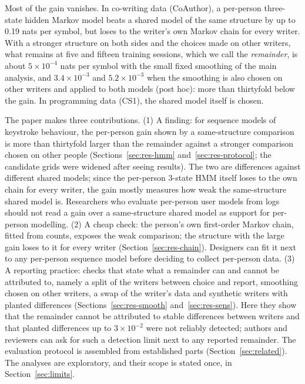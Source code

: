 \documentclass[pdflatex,sn-basic]{sn-jnl}
\newcommand{\hmmthree}{\mbox{3-state} HMM}
\begin{document}
Most of the gain vanishes. In co-writing data (CoAuthor), a per-person three-state hidden Markov model beats a shared model of the same structure by up to 0.19 nats per symbol, but loses to the writer's own Markov chain for every writer. With a stronger structure on both sides and the choices made on other writers, what remains at five and fifteen training sessions, which we call the \emph{remainder}, is about $5\times10^{-4}$ nats per symbol with the small fixed smoothing of the main analysis, and $3.4\times10^{-3}$ and $5.2\times10^{-3}$ when the smoothing is also chosen on other writers and applied to both models (post hoc): more than thirtyfold below the gain. In programming data (CS1), the shared model itself is chosen.

The paper makes three contributions.
(1) A finding: for sequence models of keystroke behaviour, the per-person gain shown by a same-structure comparison is more than thirtyfold larger than the remainder against a stronger comparison chosen on other people (Sections~\ref{sec:res-hmm} and~\ref{sec:res-protocol}; the candidate grids were widened after seeing results). The two are differences against different shared models; since the per-person \hmmthree{} itself loses to the own chain for every writer, the gain mostly measures how weak the same-structure shared model is. Researchers who evaluate per-person user models from logs should not read a gain over a same-structure shared model as support for per-person modelling.
(2) A cheap check: the person's own first-order Markov chain, fitted from counts, exposes the weak comparison; the structure with the large gain loses to it for every writer (Section~\ref{sec:res-chain}). Designers can fit it next to any per-person sequence model before deciding to collect per-person data.
(3) A reporting practice: checks that state what a remainder can and cannot be attributed to, namely a split of the writers between choice and report, smoothing chosen on other writers, a swap of the writer's data and synthetic writers with planted differences (Sections~\ref{sec:res-smooth} and~\ref{sec:res-sens}). Here they show that the remainder cannot be attributed to stable differences between writers and that planted differences up to $3\times10^{-2}$ were not reliably detected; authors and reviewers can ask for such a detection limit next to any reported remainder.
The evaluation protocol is assembled from established parts (Section~\ref{sec:related}). The analyses are exploratory, and their scope is stated once, in Section~\ref{sec:limits}.
\end{document}
